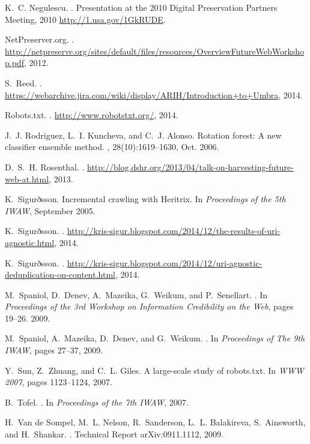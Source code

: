 \documentclass{ipres_proc_article-sp}
\begin{document}
\begin{thebibliography}{10}
K.~C. Negulescu.
.
\newblock Presentation at the 2010 Digital Preservation Partners Meeting, 2010
  \url{http://1.usa.gov/1GkRUDE}.

{NetPreserver.org}.
.
\newblock
  \url{http://netpreserve.org/sites/default/files/resources/OverviewFutureWebWorkshop.pdf},
  2012.

S.~Reed.
.
\newblock
  \url{https://webarchive.jira.com/wiki/display/ARIH/Introduction+to+Umbra},
  2014.

{Robots.txt}.
.
\newblock \url{http://www.robotstxt.org/}, 2014.

J.~J. Rodriguez, L.~I. Kuncheva, and C.~J. Alonso.
\newblock Rotation forest: A new classifier ensemble method.
,
  28(10):1619--1630, Oct. 2006.

D.~S.~H. Rosenthal.
.
\newblock
  \url{http://blog.dshr.org/2013/04/talk-on-harvesting-future-web-at.html},
  2013.

K.~Sigurðsson.
\newblock Incremental crawling with {Heritrix}.
\newblock In {\em Proceedings of the 5th IWAW},
  September 2005.

K.~Sigurðsson.
.
\newblock
  \url{http://kris-sigur.blogspot.com/2014/12/the-results-of-uri-agnostic.html},
  2014.

K.~Sigurðsson.
.
\newblock
  \url{http://kris-sigur.blogspot.com/2014/12/uri-agnostic-deduplication-on-content.html},
  2014.

M.~Spaniol, D.~Denev, A.~Mazeika, G.~Weikum, and P.~Senellart.
.
\newblock In {\em {Proceedings of the 3rd Workshop on Information Credibility
  on the Web}}, pages 19--26. 2009.

M.~Spaniol, A.~Mazeika, D.~Denev, and G.~Weikum.
.
\newblock In {\em {Proceedings of The 9th IWAW}}, pages 27--37, 2009.

Y.~Sun, Z.~Zhuang, and C.~L. Giles.
\newblock A large-scale study of robots.txt.
\newblock In {\em WWW 2007}, pages 1123--1124, 2007.

B.~Tofel.
.
\newblock In {\em Proceedings of the 7th IWAW},
  2007.

H.~{Van de Sompel}, M.~L. Nelson, R.~Sanderson, L.~L. Balakireva, S.~Ainsworth,
  and H.~Shankar.
.
\newblock Technical Report arXiv:0911.1112,
  2009.

\end{thebibliography}
\end{document}
